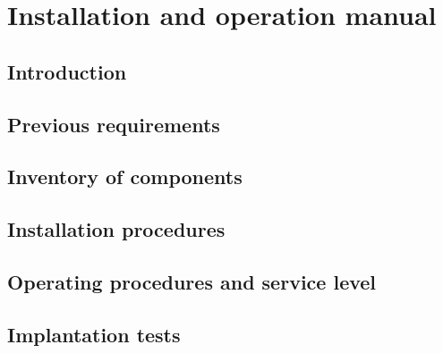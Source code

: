 \chapter{Installation and operation manual}

\section{Introduction}

\section{Previous requirements}

\section{Inventory of components}

\section{Installation procedures}

\section{Operating procedures and service level}

\section{Implantation tests}